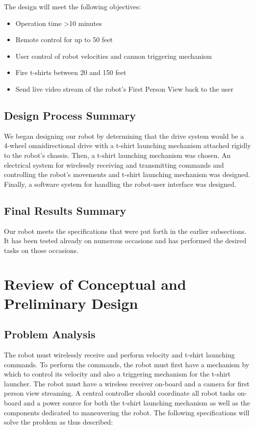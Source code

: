 \documentclass[letterpaper,12pt]{article}
\begin{document}
The design will meet the following objectives:
\begin{itemize}
    \item Operation time \textgreater 10 minutes
    \item Remote control for up to 50 feet
    \item User control of robot velocities and cannon triggering mechanism
    \item Fire t-shirts between 20 and 150 feet
    \item Send live video stream of the robot's First Person View back to the user
\end{itemize}

\subsection{Design Process Summary}
\label{sec:designprocesssummary}
We began designing our robot by determining that the drive system would be
a 4-wheel omnidirectional drive with a t-shirt launching mechanism attached
rigidly to the robot's chassis. Then, a t-shirt launching mechanism was chosen.
An electrical system for wirelessly receiving and transmitting commands and
controlling the robot's movements and t-shirt launching mechanism was designed.
Finally, a software system for handling the robot-user interface was designed.

\subsection{Final Results Summary}
\label{sec:resultssummary}
Our robot meets the specifications that were put forth in the earlier
subsections. It has been tested already on numerous occasions and has performed
the desired tasks on those occasions.

\section{Review of Conceptual and Preliminary Design}
\label{sec:conceptualpreliminarydesign}

\subsection{Problem Analysis}
\label{sec:probanalysis}
The robot must wirelessly receive and perform velocity and t-shirt launching
commands. To perform the commands, the robot must first have a mechanism by
which to control its velocity and also a triggering mechanism for the t-shirt
launcher. The robot must have a wireless receiver on-board and a camera for
first person view streaming. A central controller should coordinate all robot
tasks on-board and a power source for both the t-shirt launching mechanism as
well as the components dedicated to maneuvering the robot. The following
specifications will solve the problem as thus described:
\end{document}
